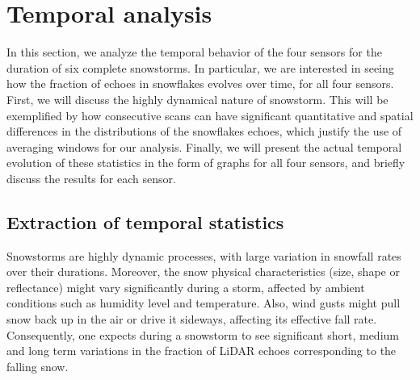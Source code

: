 



\section{Temporal analysis}
\label{sec:temporal}

In this section, we analyze the temporal behavior of the four sensors for the duration of six complete snowstorms. In particular, we are interested in seeing how the fraction of echoes in snowflakes evolves over time, for all four sensors. First, we will discuss the highly dynamical nature of snowstorm. This will be exemplified by how consecutive scans can have significant quantitative and spatial differences in the distributions of the snowflakes echoes, which justify the use of averaging windows for our analysis. Finally, we will present the actual temporal evolution of these statistics in the form of graphs for all four sensors, and briefly discuss the results for each sensor.

\subsection{Extraction of temporal statistics}

Snowstorms are highly dynamic processes, with large variation in snowfall rates over their durations. Moreover, the snow physical characteristics (size, shape or reflectance) might vary significantly during a storm, affected by ambient conditions such as humidity level and temperature. Also, wind gusts might pull snow back up in the air or drive it sideways, affecting its effective fall rate. Consequently, one expects during a snowstorm to see significant short, medium and long term variations in the fraction of LiDAR echoes corresponding to the falling snow. 

